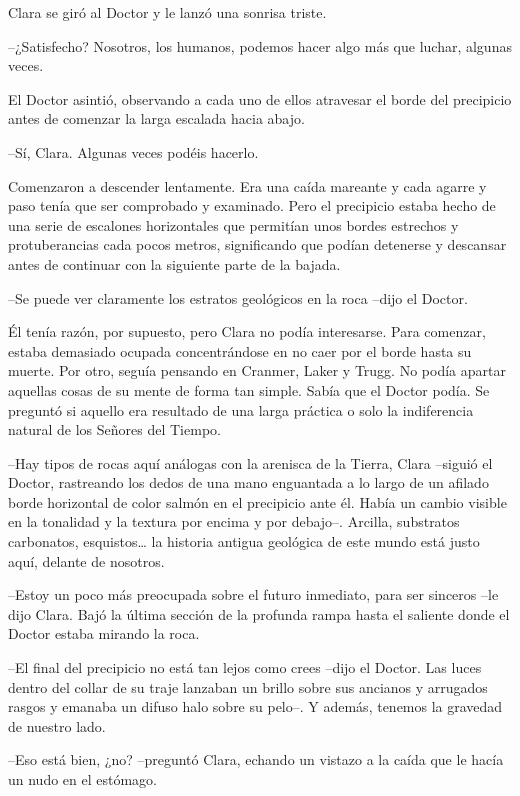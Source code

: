 {Clara se giró al Doctor y le lanzó una sonrisa triste.}

{--¿Satisfecho? Nosotros, los humanos, podemos hacer algo más que luchar,
algunas veces.}

{El Doctor asintió, observando a cada uno de ellos atravesar el borde del
precipicio antes de comenzar la larga escalada hacia abajo.}

{--Sí, Clara. Algunas veces podéis hacerlo.}

{Comenzaron a
 descender lentamente. Era una caída mareante y cada agarre y paso tenía
 que ser comprobado y examinado. Pero el precipicio estaba hecho de una
 serie de escalones horizontales que permitían unos bordes estrechos y
 protuberancias cada pocos metros, significando que podían detenerse y
descansar antes de continuar con la siguiente parte de la bajada.}

{--Se puede ver claramente los estratos geológicos en la roca --dijo el
Doctor.}

{Él tenía razón, por supuesto, pero Clara no podía interesarse. Para
 comenzar, estaba demasiado ocupada concentrándose en no caer por el
 borde hasta su muerte. Por otro, seguía pensando en Cranmer, Laker y
 Trugg. No podía apartar aquellas cosas de su mente de forma tan simple.
 Sabía que el Doctor podía. Se preguntó si aquello era resultado de una
 larga práctica o solo la indiferencia natural de los Señores del
Tiempo.}

{--Hay tipos de rocas aquí análogas con la arenisca de la Tierra, Clara
 --siguió el Doctor, rastreando los dedos de una mano enguantada a lo
 largo de un afilado borde horizontal de color salmón en el precipicio
 ante él. Había un cambio visible en la tonalidad y la textura por encima
 y por debajo--. Arcilla, substratos carbonatos, esquistos\ldots{} la
 historia antigua geológica de este mundo está justo aquí, delante de
nosotros.}

{--Estoy un poco más preocupada sobre el futuro inmediato, para ser
 sinceros --le dijo Clara. Bajó la última sección de la profunda rampa
hasta el saliente donde el Doctor estaba mirando la roca.}

{--El final del precipicio no está tan lejos como crees --dijo el Doctor.
 Las luces dentro del collar de su traje lanzaban un brillo sobre sus
 ancianos y arrugados rasgos y emanaba un difuso halo sobre su pelo--. Y
además, tenemos la gravedad de nuestro lado.}

{--Eso está bien, ¿no? --preguntó Clara, echando un vistazo a la caída
que le hacía un nudo en el estómago.}

